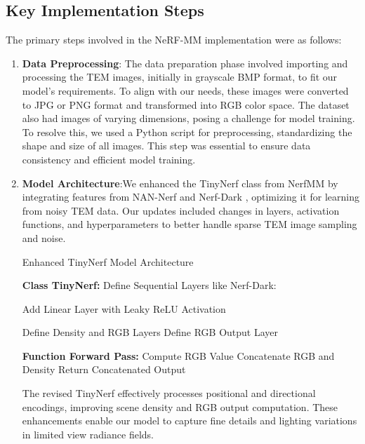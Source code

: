 \subsection{Key Implementation Steps}
The primary steps involved in the NeRF-MM implementation were as follows:
\begin{enumerate}
    \item \textbf{Data Preprocessing}: The data preparation phase involved importing and processing the TEM images, initially in grayscale BMP format, to fit our model's requirements. To align with our needs, these images were converted to JPG or PNG format and transformed into RGB color space. The dataset also had images of varying dimensions, posing a challenge for model training. To resolve this, we used a Python script for preprocessing, standardizing the shape and size of all images. This step was essential to ensure data consistency and efficient model training.

    \item \textbf{Model Architecture}:We enhanced the TinyNerf class from NerfMM\cite{Wang2021} by integrating features from NAN-Nerf \cite{Pearl2022} and Nerf-Dark \cite{Mildenhall2021}, optimizing it for learning from noisy TEM data. Our updates included changes in layers, activation functions, and hyperparameters to better handle sparse TEM image sampling and noise.
    \begin{adjustwidth}{20pt}{}
    \begin{algorithm}
    \caption{Enhanced TinyNerf Model Architecture}  
    \begin{algorithmic}[1]
    
    \STATE \textbf{Class TinyNerf:}
    \STATE Define Sequential Layers like Nerf-Dark:   
    
    \STATE Add Linear Layer with Leaky ReLU Activation
    \ENDFOR
      
    \STATE Define Density and RGB Layers    
    \STATE Define RGB Output Layer  
    
    \STATE \textbf{Function Forward Pass:} 
    \STATE Compute RGB Value
    \STATE Concatenate RGB and Density
    \STATE Return Concatenated Output
    \ENDFOR  
      
    \end{algorithmic}
    \end{algorithm}
    \end{adjustwidth}

    The revised TinyNerf effectively processes positional and directional encodings, improving scene density and RGB output computation. These enhancements enable our model to capture fine details and lighting variations in limited view radiance fields.
    

\end{enumerate}
